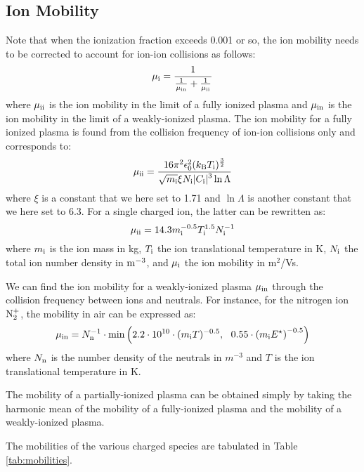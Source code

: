 \documentclass{warpdoc}
\newcommand{\mfd}{\displaystyle}
\begin{document}
\subsection{Ion Mobility}

Note that when the ionization fraction exceeds 0.001 or so, the ion mobility needs to be corrected to account for ion-ion collisions as follows:
%
\begin{equation}
\mu_{\rm i}=\frac{1}{\frac{1}{\mu_{\rm in}}+\frac{1}{\mu_{\rm ii}}}
\end{equation}
%
where $\mu_{\rm ii}$ is the ion mobility in the limit of a fully ionized plasma and $\mu_{\rm in}$ is the ion mobility in the limit of a weakly-ionized plasma. The ion mobility for a fully ionized plasma is found from the collision frequency of ion-ion collisions only and corresponds to:
%
\begin{equation}
 \mu_{\rm ii} = \frac{16 \pi^2 \epsilon_0^2 (k_{\rm B} T_{\rm i})^\frac{3}{2}}{\mfd \sqrt{m_{\rm i}} \xi  N_{\rm i}  |C_{\rm i}|^3  \ln \Lambda}
\end{equation}
% 
where $\xi$ is a constant that we here set to 1.71 and $\ln \Lambda$ is another constant that we here set to 6.3. For a single charged ion, the latter can be rewritten as:
%
\begin{equation}
 \mu_{\rm ii} = 14.3 m_{\rm i}^{-0.5} T_{\rm i}^{1.5} N_{\rm i}^{-1}
\end{equation}
% 
where $m_{\rm i}$ is the ion mass in kg, $T_{\rm i}$ the ion translational temperature in K, $N_{\rm i}$ the total ion number density in $\rm m^{-3}$, and $\mu_{\rm i}$ the ion mobility in m$^2$/Vs.


We can find the ion mobility for a weakly-ionized plasma $\mu_{\rm in}$ through the collision frequency between ions and neutrals. For instance, for the nitrogen ion $\rm N_2^+$, the mobility in air can be expressed as:
%
\begin{equation}
\mu_{\rm in}=N_{\rm n}^{-1} \cdot {\rm min}\left(2.2\cdot 10^{10} \cdot (m_{\rm i} T)^{-0.5},~~0.55  \cdot \left(m_{\rm i} E^\star\right)^{-0.5}\right)
\end{equation}
%
where $N_{\rm n}$ is the number density of the neutrals in $m^{-3}$ and $T$ is the ion translational temperature in K.

The mobility of a partially-ionized plasma can be obtained simply by taking the harmonic mean of the mobility of a fully-ionized plasma and the mobility of a weakly-ionized plasma. 

The mobilities of the various charged species are tabulated in Table \ref{tab:mobilities}. 
\end{document}
